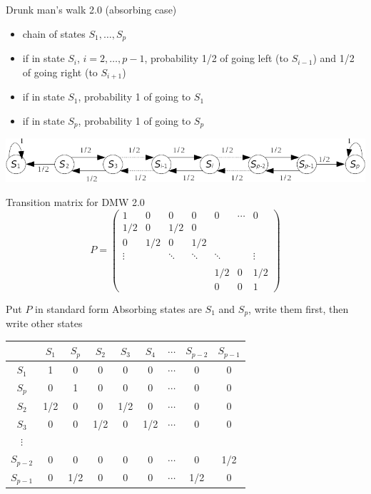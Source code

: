 \documentclass[aspectratio=43]{beamer}
\begin{document}
\begin{frame}{Drunk man's walk 2.0 (absorbing case)}
    \begin{itemize}
        \item chain of states $S_1,\ldots,S_p$
        \item if in state $S_i$, $i=2,\ldots,p-1$, probability 1/2 of going left (to $S_{i-1}$) and 1/2 of going right (to $S_{i+1}$)
        \item if in state $S_1$, probability 1 of going to $S_1$
        \item if in state $S_p$, probability 1 of going to $S_p$
    \end{itemize}
    \vfill
\begin{center}
    \includegraphics[width=\textwidth]{FIGS/drunk_mans_walk_absorbing}
\end{center}
\end{frame}


\begin{frame}{Transition matrix for DMW 2.0}
    $$
    P=\begin{pmatrix}
    1 & 0 & 0 & 0 & 0 & \cdots & 0\\
    1/2 & 0 & 1/2 & 0 & & & \\
    0 & 1/2 & 0 & 1/2 & & & \\
    \vdots & & \ddots & \ddots & \ddots & & \vdots \\
    & & & & & & \\
    & & & & 1/2 & 0 & 1/2 \\
    & & & & 0 & 0 & 1
    \end{pmatrix}
    $$    
\end{frame}


\begin{frame}{Put $P$ in standard form}
    Absorbing states are $S_1$ and $S_p$, write them first, then write other states

    \begin{center}
        \begin{tabular}{c|cccccccc}
            & $S_1$ & $S_p$ & $S_2$ & $S_3$ & $S_4$ & $\cdots$ & $S_{p-2}$ & $S_{p-1}$ \\
            \hline 
            $S_1$ & 1 & 0 & 0 & 0 & 0 & $\cdots$ & 0 & 0 \\
            $S_p$ & 0 & 1 & 0 & 0 & 0 & $\cdots$ & 0 & 0 \\
            $S_2$ & 1/2 & 0 & 0 & 1/2 & 0 & $\cdots$ & 0 & 0 \\
            $S_3$ & 0 & 0 & 1/2 & 0 & 1/2 & $\cdots$ & 0 & 0 \\
            $\vdots$ &  &  &  &  & & & & \\
            $S_{p-2}$ & 0 & 0 & 0 & 0 & 0 & $\cdots$ & 0 & 1/2 \\
            $S_{p-1}$ & 0 & 1/2 & 0 & 0 & 0 & $\cdots$ & 1/2 & 0                 
        \end{tabular}
    \end{center}
\end{frame}
\end{document}
